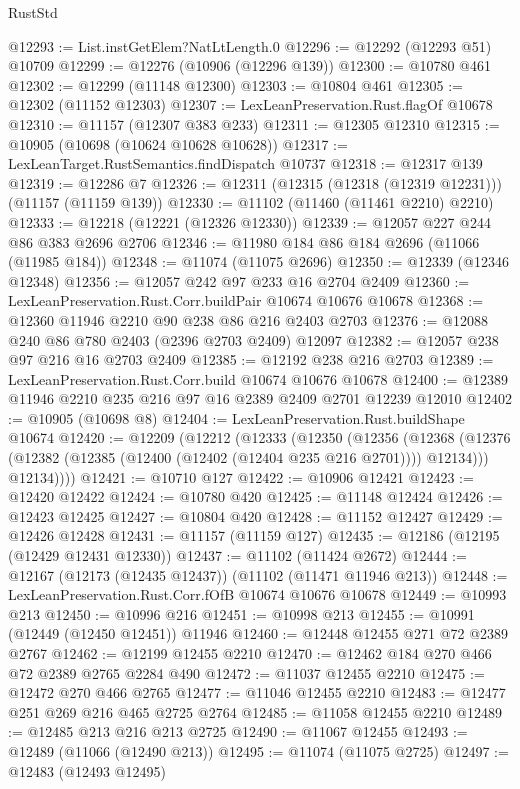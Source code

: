 \begin{lexlean}{RustStd}
\begin{coremodule}
@12293 := List.instGetElem?NatLtLength.{0}
@12296 := @12292 (@12293 @51) @10709
@12299 := @12276 (@10906 (@12296 @139))
@12300 := @10780 @461
@12302 := @12299 (@11148 @12300)
@12303 := @10804 @461
@12305 := @12302 (@11152 @12303)
@12307 := LexLeanPreservation.Rust.flagOf @10678
@12310 := @11157 (@12307 @383 @233)
@12311 := @12305 @12310
@12315 := @10905 (@10698 (@10624 @10628 @10628))
@12317 := LexLeanTarget.RustSemantics.findDispatch @10737
@12318 := @12317 @139
@12319 := @12286 @7
@12326 := @12311 (@12315 (@12318 (@12319 @12231))) (@11157 (@11159 @139))
@12330 := @11102 (@11460 (@11461 @2210) @2210)
@12333 := @12218 (@12221 (@12326 @12330))
@12339 := @12057 @227 @244 @86 @383 @2696 @2706
@12346 := @11980 @184 @86 @184 @2696 (@11066 (@11985 @184))
@12348 := @11074 (@11075 @2696)
@12350 := @12339 (@12346 @12348)
@12356 := @12057 @242 @97 @233 @16 @2704 @2409
@12360 := LexLeanPreservation.Rust.Corr.buildPair @10674 @10676 @10678
@12368 := @12360 @11946 @2210 @90 @238 @86 @216 @2403 @2703
@12376 := @12088 @240 @86 @780 @2403 (@2396 @2703 @2409) @12097
@12382 := @12057 @238 @97 @216 @16 @2703 @2409
@12385 := @12192 @238 @216 @2703
@12389 := LexLeanPreservation.Rust.Corr.build @10674 @10676 @10678
@12400 := @12389 @11946 @2210 @235 @216 @97 @16 @2389 @2409 @2701 @12239 @12010
@12402 := @10905 (@10698 @8)
@12404 := LexLeanPreservation.Rust.buildShape @10674
@12420 := @12209
    (@12212
      (@12333
        (@12350
          (@12356
            (@12368 (@12376 (@12382 (@12385 (@12400 (@12402 (@12404 @235 @216 @2701)))) @12134)))
            @12134))))
@12421 := @10710 @127
@12422 := @10906 @12421
@12423 := @12420 @12422
@12424 := @10780 @420
@12425 := @11148 @12424
@12426 := @12423 @12425
@12427 := @10804 @420
@12428 := @11152 @12427
@12429 := @12426 @12428
@12431 := @11157 (@11159 @127)
@12435 := @12186 (@12195 (@12429 @12431 @12330))
@12437 := @11102 (@11424 @2672)
@12444 := @12167 (@12173 (@12435 @12437)) (@11102 (@11471 @11946 @213))
@12448 := LexLeanPreservation.Rust.Corr.fOfB @10674 @10676 @10678
@12449 := @10993 @213
@12450 := @10996 @216
@12451 := @10998 @213
@12455 := @10991 (@12449 (@12450 @12451)) @11946
@12460 := @12448 @12455 @271 @72 @2389 @2767
@12462 := @12199 @12455 @2210
@12470 := @12462 @184 @270 @466 @72 @2389 @2765 @2284 @490
@12472 := @11037 @12455 @2210
@12475 := @12472 @270 @466 @2765
@12477 := @11046 @12455 @2210
@12483 := @12477 @251 @269 @216 @465 @2725 @2764
@12485 := @11058 @12455 @2210
@12489 := @12485 @213 @216 @213 @2725
@12490 := @11067 @12455
@12493 := @12489 (@11066 (@12490 @213))
@12495 := @11074 (@11075 @2725)
@12497 := @12483 (@12493 @12495)

\end{coremodule}
\end{lexlean}
